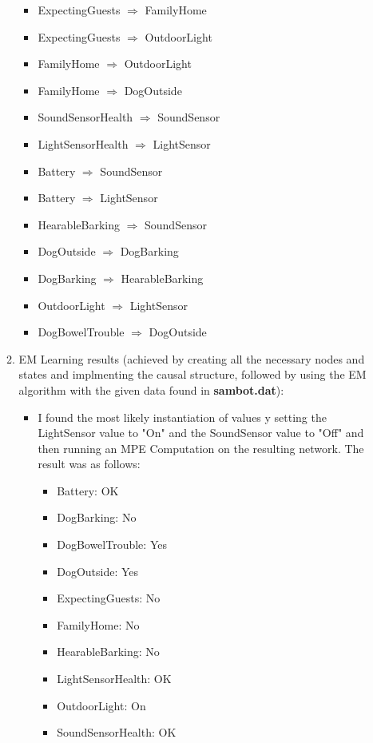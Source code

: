 \documentclass[12pt]{article}
\begin{document}
\begin{enumerate}
\begin{enumerate}
		\begin{itemize}
			\item ExpectingGuests $\Rightarrow$ FamilyHome
			\item ExpectingGuests $\Rightarrow$ OutdoorLight
			\item FamilyHome $\Rightarrow$ OutdoorLight
			\item FamilyHome $\Rightarrow$ DogOutside
			\item SoundSensorHealth $\Rightarrow$ SoundSensor
			\item LightSensorHealth $\Rightarrow$ LightSensor
			\item Battery $\Rightarrow$ SoundSensor
			\item Battery $\Rightarrow$ LightSensor
			\item HearableBarking $\Rightarrow$ SoundSensor
			\item DogOutside $\Rightarrow$ DogBarking
			\item DogBarking $\Rightarrow$ HearableBarking
			\item OutdoorLight $\Rightarrow$ LightSensor
			\item DogBowelTrouble $\Rightarrow$ DogOutside
		\end{itemize}

		\item EM Learning results (achieved by creating all the necessary nodes and states and implmenting the causal structure, followed by using the EM algorithm with the given data found in \textbf{sambot.dat}):

		\begin{itemize}
			\item I found the most likely instantiation of values y setting the LightSensor value to "On" and the SoundSensor value to "Off" and then running an MPE Computation on the resulting network. The result was as follows:

			\begin{itemize}
				\item Battery: OK
				\item DogBarking: No
				\item DogBowelTrouble: Yes
				\item DogOutside: Yes
				\item ExpectingGuests: No
				\item FamilyHome: No
				\item HearableBarking: No
				\item LightSensorHealth: OK
				\item OutdoorLight: On
				\item SoundSensorHealth: OK
			\end{itemize}


\end{itemize}
\end{enumerate}
\end{enumerate}
\end{document}
